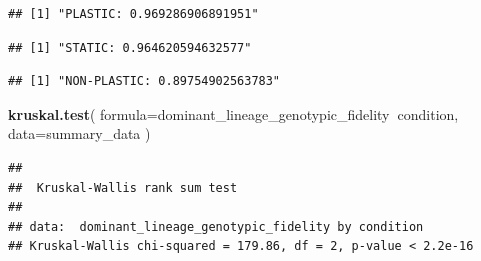 \documentclass[]{book}
\newenvironment{Shaded}{\begin{snugshade}}{\end{snugshade}}
\newcommand{\DataTypeTok}[1]{\textcolor[rgb]{0.13,0.29,0.53}{#1}}
\newcommand{\KeywordTok}[1]{\textcolor[rgb]{0.13,0.29,0.53}{\textbf{#1}}}
\newcommand{\NormalTok}[1]{#1}
\newcommand{\OperatorTok}[1]{\textcolor[rgb]{0.81,0.36,0.00}{\textbf{#1}}}
\newcommand{\StringTok}[1]{\textcolor[rgb]{0.31,0.60,0.02}{#1}}
\begin{document}
\begin{verbatim}
## [1] "PLASTIC: 0.969286906891951"
\end{verbatim}

\begin{Shaded}
\end{Shaded}

\begin{verbatim}
## [1] "STATIC: 0.964620594632577"
\end{verbatim}

\begin{Shaded}
\end{Shaded}

\begin{verbatim}
## [1] "NON-PLASTIC: 0.89754902563783"
\end{verbatim}

\begin{Shaded}
\begin{Highlighting}[]
\KeywordTok{kruskal.test}\NormalTok{(}
  \DataTypeTok{formula=}\NormalTok{dominant_lineage_genotypic_fidelity}\OperatorTok{~}\NormalTok{condition,}
  \DataTypeTok{data=}\NormalTok{summary_data}
\NormalTok{)}
\end{Highlighting}
\end{Shaded}

\begin{verbatim}
## 
##  Kruskal-Wallis rank sum test
## 
## data:  dominant_lineage_genotypic_fidelity by condition
## Kruskal-Wallis chi-squared = 179.86, df = 2, p-value < 2.2e-16
\end{verbatim}

\begin{Shaded}
\end{Shaded}
\end{document}
